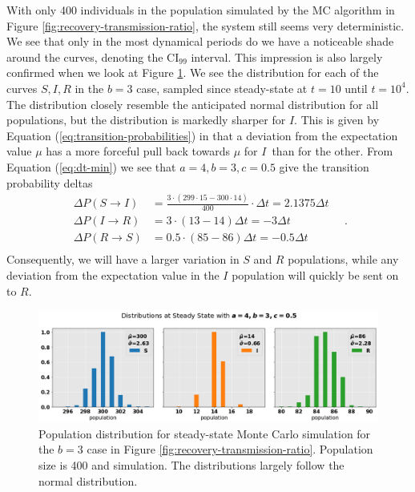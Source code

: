 \documentclass[]{article}
\begin{document}
With only 400 individuals in the population simulated by the MC algorithm in Figure \ref{fig:recovery-transmission-ratio}, the system still seems very deterministic. We see that only in the most dynamical periods do we have a noticeable shade around the curves, denoting the CI$_{99}$ interval. This impression is also largely confirmed when we look at Figure \ref{fig:recovery-transmission-ratio-distribution}. We see the distribution for each of the curves $S, I, R$ in the $b=3$ case, sampled since steady-state at $t=10$ until $t=10^4$. The distribution closely resemble the anticipated normal distribution for all populations, but the distribution is markedly sharper for $I$. This is given by Equation (\ref{eq:transition-probabilities}) in that a deviation from the expectation value $\mu$ has a more forceful pull back towards $\mu$ for $I$ than for the other. From Equation (\ref{eq:dt-min}) we see that $a=4, b=3, c=0.5$ give the transition probability deltas
\begin{equation}
\begin{aligned}
	\Delta P(S \rightarrow I) &= \frac{3 \cdot (299 \cdot 15 - 300 \cdot 14)}{400} \cdot \Delta t = 2.1375 \Delta t \\		
	\Delta P(I \rightarrow R) &= 3 \cdot (13 - 14) \Delta t = - 3\Delta t \\	
	\Delta P(R \rightarrow S) &= 0.5 \cdot (85-86) \Delta t = - 0.5\Delta t \\		
\end{aligned} \quad .
\end{equation}
Consequently, we will have a larger variation in $S$ and $R$ populations, while any deviation from the expectation value in the $I$ population will quickly be sent on to $R$.

\begin{figure}[!h]
	\centering
	\includegraphics[width=1\linewidth]{./figs/recovery-transmission-ratio-distribution.png}
	\caption{Population distribution for steady-state Monte Carlo simulation for the $b=3$ case in Figure \ref{fig:recovery-transmission-ratio}. Population size is 400 and simulation. The distributions largely follow the normal distribution.}
	\label{fig:recovery-transmission-ratio-distribution}
\end{figure}
\end{document}
